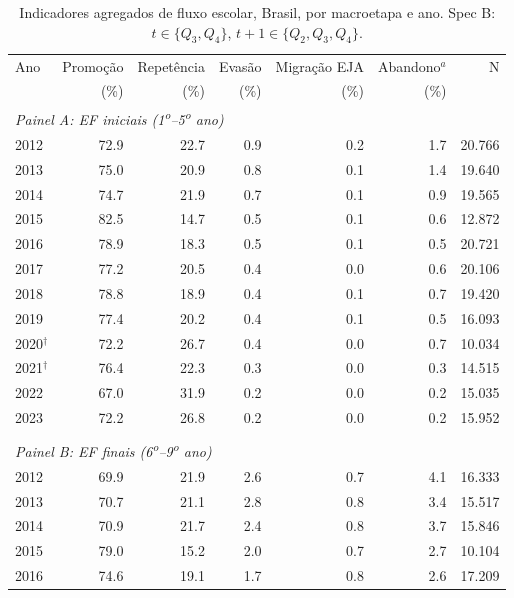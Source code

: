 \begin{table}[htbp]
\centering
\caption{Indicadores agregados de fluxo escolar, Brasil, por macroetapa e ano. Spec B: $t \in \{Q_3, Q_4\}$, $t{+}1 \in \{Q_2, Q_3, Q_4\}$.}
\label{tab:t1_brasil}
\begin{threeparttable}
\small
\begin{tabular}{lrrrrrr}
\toprule
Ano & Promo\c{c}\~ao & Repet\^encia & Evas\~ao & Migra\c{c}\~ao EJA & Abandono$^{a}$ & N \\
    & (\%)            & (\%)        & (\%)     & (\%)               & (\%)            &   \\
\midrule
\multicolumn{7}{l}{\textit{Painel A: EF iniciais (1\textsuperscript{o}--5\textsuperscript{o} ano)}} \\
\midrule
2012 & 72.9 & 22.7 & 0.9 & 0.2 & 1.7 & 20.766 \\
2013 & 75.0 & 20.9 & 0.8 & 0.1 & 1.4 & 19.640 \\
2014 & 74.7 & 21.9 & 0.7 & 0.1 & 0.9 & 19.565 \\
2015 & 82.5 & 14.7 & 0.5 & 0.1 & 0.6 & 12.872 \\
2016 & 78.9 & 18.3 & 0.5 & 0.1 & 0.5 & 20.721 \\
2017 & 77.2 & 20.5 & 0.4 & 0.0 & 0.6 & 20.106 \\
2018 & 78.8 & 18.9 & 0.4 & 0.1 & 0.7 & 19.420 \\
2019 & 77.4 & 20.2 & 0.4 & 0.1 & 0.5 & 16.093 \\
2020$^{\dagger}$ & 72.2 & 26.7 & 0.4 & 0.0 & 0.7 & 10.034 \\
2021$^{\dagger}$ & 76.4 & 22.3 & 0.3 & 0.0 & 0.3 & 14.515 \\
2022 & 67.0 & 31.9 & 0.2 & 0.0 & 0.2 & 15.035 \\
2023 & 72.2 & 26.8 & 0.2 & 0.0 & 0.2 & 15.952 \\
\\[0.3em]
\multicolumn{7}{l}{\textit{Painel B: EF finais (6\textsuperscript{o}--9\textsuperscript{o} ano)}} \\
\midrule
2012 & 69.9 & 21.9 & 2.6 & 0.7 & 4.1 & 16.333 \\
2013 & 70.7 & 21.1 & 2.8 & 0.8 & 3.4 & 15.517 \\
2014 & 70.9 & 21.7 & 2.4 & 0.8 & 3.7 & 15.846 \\
2015 & 79.0 & 15.2 & 2.0 & 0.7 & 2.7 & 10.104 \\
2016 & 74.6 & 19.1 & 1.7 & 0.8 & 2.6 & 17.209 \\

\end{tabular}
\end{threeparttable}
\end{table}
